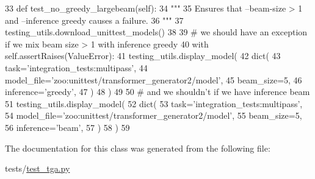 \begin{DoxyCode}
33     \textcolor{keyword}{def }test\_no\_greedy\_largebeam(self):
34         \textcolor{stringliteral}{"""}
35 \textcolor{stringliteral}{        Ensures that --beam-size > 1 and --inference greedy causes a failure.}
36 \textcolor{stringliteral}{        """}
37         testing\_utils.download\_unittest\_models()
38 
39         \textcolor{comment}{# we should have an exception if we mix beam size > 1 with inference greedy}
40         with self.assertRaises(ValueError):
41             testing\_utils.display\_model(
42                 dict(
43                     task=\textcolor{stringliteral}{'integration\_tests:multipass'},
44                     model\_file=\textcolor{stringliteral}{'zoo:unittest/transformer\_generator2/model'},
45                     beam\_size=5,
46                     inference=\textcolor{stringliteral}{'greedy'},
47                 )
48             )
49 
50         \textcolor{comment}{# and we shouldn't if we have inference beam}
51         testing\_utils.display\_model(
52             dict(
53                 task=\textcolor{stringliteral}{'integration\_tests:multipass'},
54                 model\_file=\textcolor{stringliteral}{'zoo:unittest/transformer\_generator2/model'},
55                 beam\_size=5,
56                 inference=\textcolor{stringliteral}{'beam'},
57             )
58         )
59 
\end{DoxyCode}


The documentation for this class was generated from the following file\+:\begin{DoxyCompactItemize}
\item 
tests/\hyperlink{test__tga_8py}{test\+\_\+tga.\+py}\end{DoxyCompactItemize}
